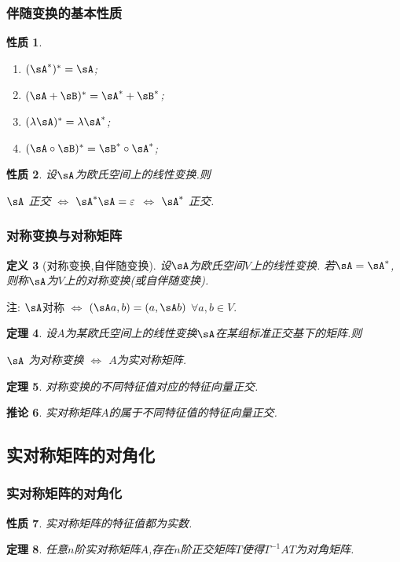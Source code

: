 \documentclass{article}
\newtheorem{theorem}{定理}  %
\newtheorem{proposition}[theorem]{性质}  %
\newtheorem{definition}[theorem]{定义}
\newtheorem{corollary}[theorem]{推论}
\renewcommand{\blue }[1]{{\textcolor[rgb]{0,0,1}{#1}}}
\begin{document}
\subsubsection{伴随变换的基本性质}
\begin{proposition}
\begin{enumerate}
\item $(\sA^*)^*=\sA$;
\item $(\sA+\sB)^*=\sA^*+\sB^*$;
\item $(\lambda \sA)^* = \lambda \sA^*$;
\item $(\sA\circ\sB)^* = \sB^*\circ\sA^*$;
\end{enumerate}
\end{proposition}
\begin{proposition}
设$\sA$为欧氏空间上的线性变换.则
\begin{center}
$\sA$ 正交 \quad $\Leftrightarrow$ \quad $\sA^*\sA=\varepsilon$ \quad $\Leftrightarrow$ \quad $\sA^*$ 正交.
\end{center}
\end{proposition}

\subsubsection{对称变换与对称矩阵}
\begin{definition}[对称变换,自伴随变换]
设$\sA$为欧氏空间$V$上的线性变换.
若$\sA=\sA^*$,则称$\sA$为$V$上的\blue{对称变换}(或\blue{自伴随变换}).
\end{definition}
注: $\sA$对称 $\Leftrightarrow$ $(\sA a,b)=(a,\sA b)$ $\forall a,b\in V$.
\begin{theorem}
设$A$为某欧氏空间上的线性变换$\sA$在某组标准正交基下的矩阵.则
\begin{center}
$\sA$ 为对称变换 $\Leftrightarrow$ $A$为实对称矩阵.
\end{center}
\end{theorem}
\begin{theorem}
对称变换的不同特征值对应的特征向量正交.
\end{theorem}
\begin{corollary}
实对称矩阵$A$的属于不同特征值的特征向量正交.
\end{corollary}


\subsection{实对称矩阵的对角化}

\subsubsection{实对称矩阵的对角化}
\begin{proposition}
实对称矩阵的特征值都为实数.
\end{proposition}
\begin{theorem}
任意$n$阶实对称矩阵$A$,存在$n$阶正交矩阵$T$使得$T^{-1}AT$为对角矩阵.
\end{theorem}
\end{document}
